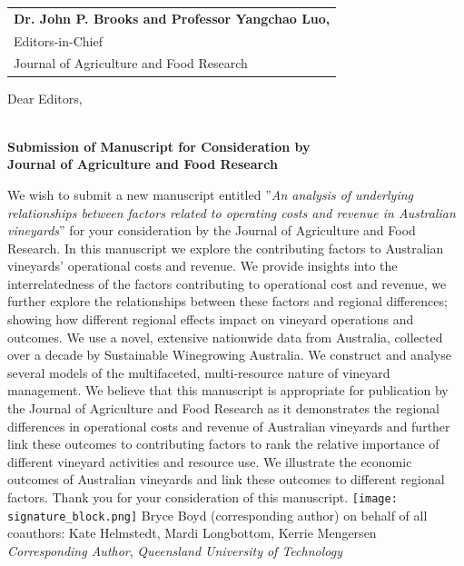 \documentclass{article}
\begin{document}
\begin{tabular}{@{} l}
	\textbf{Dr. John P. Brooks and Professor Yangchao Luo,}\\ Editors-in-Chief \\ Journal of Agriculture and Food Research
\end{tabular}

\bigskip %

Dear Editors,
\\~\\
\parskip %

\centering \textbf{Submission of Manuscript for Consideration by \\Journal of Agriculture and Food Research}\\
\bigskip %
\justifying
\noindent

\bigskip \noindent%
We wish to submit a new manuscript entitled  ''\textit{An analysis of underlying relationships between factors related to operating costs and revenue in Australian vineyards}'' for your consideration by the Journal of Agriculture and Food Research.
\newline \noindent
In this manuscript we explore the contributing factors to Australian vineyards' operational costs and revenue. We provide insights into the interrelatedness of the factors contributing to operational cost and revenue, we further explore the relationships between these factors and regional differences; showing how different regional effects impact on vineyard operations and outcomes. We use a novel, extensive nationwide data from Australia, collected over a decade by Sustainable Winegrowing Australia. We construct and analyse several models of the multifaceted, multi-resource nature of vineyard management.
\newline \noindent
We believe that this manuscript is appropriate for publication by the Journal of Agriculture and Food Research as it demonstrates the regional differences in operational costs and revenue of Australian vineyards and further link these outcomes to contributing factors to rank the relative importance of different vineyard activities and resource use. We illustrate the economic outcomes of Australian vineyards and link these outcomes to different regional factors. Thank you for your consideration of this manuscript.
\bigskip 
\newline \noindent%
\texttt{[image: signature\_block.png]}
\newline \noindent
Bryce Boyd (corresponding author) on behalf of all coauthors: Kate Helmstedt, Mardi Longbottom, Kerrie Mengersen\\
\newline \noindent
\textit{Corresponding Author}, \textit{Queensland University of Technology}
\end{document}

